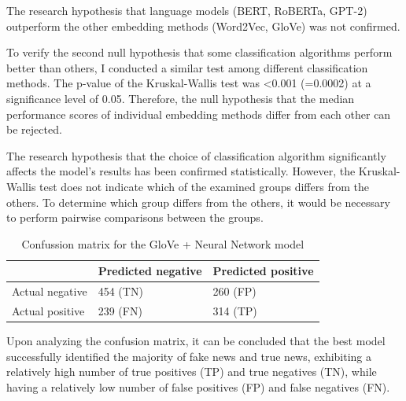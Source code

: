 The research hypothesis that language models (BERT, RoBERTa, GPT-2) outperform the other embedding methods (Word2Vec, GloVe) was not confirmed.

To verify the second null hypothesis that some classification algorithms perform better than others, I conducted a similar test among different classification methods.
The p-value of the Kruskal-Wallis test was <0.001 (=0.0002) at a significance level of 0.05. Therefore, the null hypothesis that the median performance scores of individual embedding methods differ from each other can be rejected.

The research hypothesis that the choice of classification algorithm significantly affects the model's results has been confirmed statistically.
However, the Kruskal-Wallis test does not indicate which of the examined groups differs from the others. To determine which group differs from the others, it would be necessary to perform pairwise comparisons between the groups.



\begin{table}[htb]
\centering
{
\makegapedcells
\begin{tabular}{lll}
                & Predicted negative & Predicted positive \\
\hline
Actual negative & 454 (TN)           & 260 (FP) \\
Actual positive & 239 (FN)           & 314 (TP) \\
\hline
\end{tabular}
}
\caption{Confussion matrix for the GloVe + Neural Network model}
\label{glovenn_cm}
\end{table}

Upon analyzing the confusion matrix, it can be concluded that the best model successfully identified the majority of fake news and true news, exhibiting a relatively high number of true positives (TP) and true negatives (TN), while having a relatively low number of false positives (FP) and false negatives (FN).